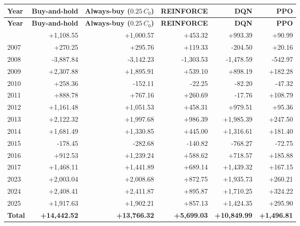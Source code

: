 \begin{longtable}{@{}lrrrrr@{}}
\toprule
\textbf{Year} & \textbf{Buy-and-hold} & \textbf{Always-buy (\(0.25\,C_0\))} & \textbf{REINFORCE} & \textbf{DQN} & \textbf{PPO} \\
\midrule
\endfirsthead
\toprule
\textbf{Year} & \textbf{Buy-and-hold} & \textbf{Always-buy (\(0.25\,C_0\))} & \textbf{REINFORCE} & \textbf{DQN} & \textbf{PPO} \\
\midrule
\endhead
\bottomrule
\endlastfoot
2006 & +1,108.55 & +1,000.57 & +453.32 & +993.39 & +90.99 \\
2007 & +270.25 & +295.76 & +119.33 & -204.50 & +20.16 \\
2008 & -3,887.84 & -3,142.23 & -1,303.53 & -1,478.59 & -542.97 \\
2009 & +2,307.88 & +1,895.91 & +539.10 & +898.19 & +182.28 \\
2010 & +258.36 & -152.11 & -22.25 & -82.20 & -47.32 \\
2011 & +888.78 & +767.16 & +260.69 & -17.76 & +108.79 \\
2012 & +1,161.48 & +1,051.53 & +458.31 & +979.51 & +95.36 \\
2013 & +2,122.32 & +1,997.68 & +986.39 & +1,985.39 & +247.50 \\
2014 & +1,681.49 & +1,330.85 & +445.00 & +1,316.61 & +181.40 \\
2015 & -178.45 & -282.68 & -140.82 & -768.27 & -72.75 \\
2016 & +912.53 & +1,239.24 & +588.62 & +718.57 & +185.88 \\
2017 & +1,468.11 & +1,441.89 & +689.14 & +1,439.32 & +167.15 \\
2023 & +2,003.04 & +2,008.68 & +872.75 & +1,935.73 & +260.21 \\
2024 & +2,408.41 & +2,411.87 & +895.87 & +1,710.25 & +324.22 \\
2025 & +1,917.63 & +1,902.21 & +857.13 & +1,424.35 & +295.90 \\
\midrule
\textbf{Total} & \textbf{+14,442.52} & \textbf{+13,766.32} & \textbf{+5,699.03} & \textbf{+10,849.99} & \textbf{+1,496.81} \\
\end{longtable}
